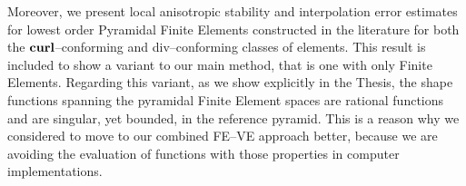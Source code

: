 \documentclass[12pt,a4paper,openany,oneside]{book}
\begin{document}
Moreover, we present local anisotropic stability
and interpolation error estimates for lowest order Pyramidal
Finite Elements constructed in the literature for both
the $\textbf{curl}$--conforming and div--conforming classes of elements. This result
is included to show a variant to our main method, that is one 
with only Finite Elements. Regarding this variant, as we show
explicitly in the Thesis, the shape functions 
spanning the pyramidal Finite Element spaces are rational functions and are 
singular, yet bounded,
in the reference pyramid. This is a reason why we considered to move
to our combined FE--VE approach better, because we are avoiding the evaluation
of functions with those properties in computer implementations. 

\frontmatter

\tableofcontents{}
\mainmatter










{}

	
\end{document}
